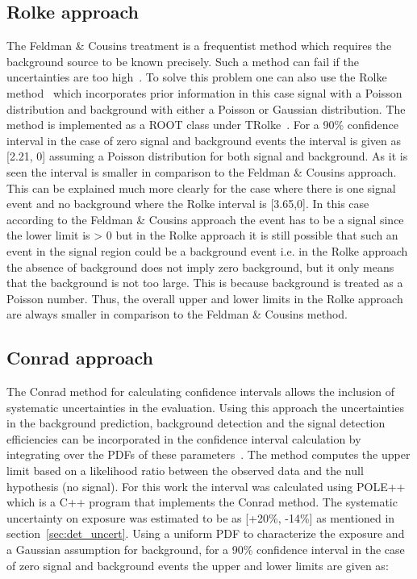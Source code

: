\subsection{Rolke approach}
\label{subsec:Rolke}
The Feldman \& Cousins treatment is a frequentist method which requires the background source to be known precisely. Such a method can fail if the uncertainties are too high~\cite{Rolke:2000ij}. To solve this problem one can also use the Rolke method~\cite{Rolke:2004mj} which incorporates prior information in this case signal with a Poisson distribution and background with either a Poisson or Gaussian distribution. The method is implemented as a ROOT class under TRolke~\cite{TRolke_ROOT}. For a 90\% confidence interval in the case of zero signal and background events the interval is given as [2.21, 0] assuming a Poisson distribution for both signal and background. As it is seen the interval is smaller in comparison to the Feldman \& Cousins approach. This can be explained much more clearly for the case where there is one signal event and no background where the Rolke interval is [3.65,0]. In this case according to the Feldman \& Cousins approach the event has to be a signal since the lower limit is > 0 but in the Rolke approach it is still possible that such an event in the signal region could be a background event i.e. in the Rolke approach the absence of background does not imply zero background, but it only means that the background is not too large. This is because background is treated as a Poisson number. Thus, the overall upper and lower limits in the Rolke approach are always smaller in comparison to the Feldman \& Cousins  method. 

\subsection{Conrad approach}
\label{subsec:Conrad}
The Conrad method for calculating confidence intervals allows the inclusion of systematic uncertainties in the evaluation. Using this approach the uncertainties in the background prediction, background detection and the signal detection efficiencies can be incorporated in the confidence interval calculation by integrating over the PDFs of these parameters~\cite{Conrad:2002kn}. The method computes the upper limit based on a likelihood ratio between the observed data and the null hypothesis (no signal). For this work the interval was calculated using POLE++~\cite{Conrad:2005zm} which is a C++ program that implements the Conrad method. The systematic uncertainty on exposure was estimated to be as [+20\%, -14\%] as mentioned in section~\ref{sec:det_uncert}. Using a uniform PDF to characterize the exposure and a Gaussian assumption for background, for a 90\% confidence interval in the case of zero signal and background events the upper and lower limits are given as: 

